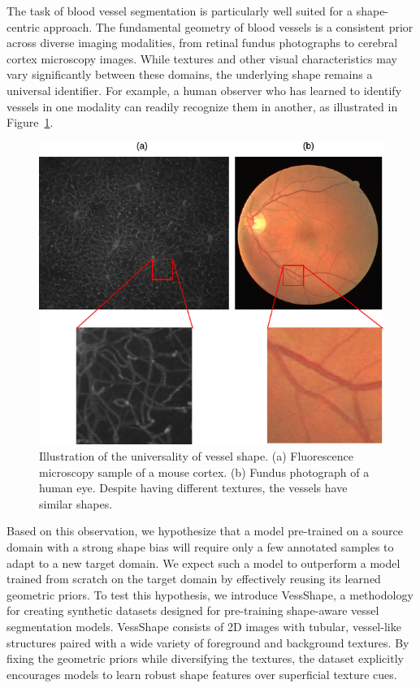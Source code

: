 \documentclass[%
reprint,
nofootinbib,
 amsmath,amssymb,
aps,
superscriptaddress,
showkeys,
longbibliography
]{revtex4-1}
\begin{document}
The task of blood vessel segmentation is particularly well suited for a shape-centric approach. The fundamental geometry of blood vessels is a consistent prior across diverse imaging modalities, from retinal fundus photographs to cerebral cortex microscopy images. While textures and other visual characteristics may vary significantly between these domains, the underlying shape remains a universal identifier. For example, a human observer who has learned to identify vessels in one modality can readily recognize them in another, as illustrated in Figure~\ref{f:motivation}.

\begin{figure}[tbp]
    \centering
    \includegraphics[width=\columnwidth]{figures/vessel_retinal_cortex.pdf}
    \caption{Illustration of the universality of vessel shape. (a) Fluorescence microscopy sample of a mouse cortex. (b) Fundus photograph of a human eye. Despite having different textures, the vessels have similar shapes.}
    \label{f:motivation}
\end{figure}

Based on this observation, we hypothesize that a model pre-trained on a source domain with a strong shape bias will require only a few annotated samples to adapt to a new target domain. We expect such a model to outperform a model trained from scratch on the target domain by effectively reusing its learned geometric priors. To test this hypothesis, we introduce VessShape, a methodology for creating synthetic datasets designed for pre-training shape-aware vessel segmentation models. VessShape consists of 2D images with tubular, vessel-like structures paired with a wide variety of foreground and background textures. By fixing the geometric priors while diversifying the textures, the dataset explicitly encourages models to learn robust shape features over superficial texture cues.
\end{document}
